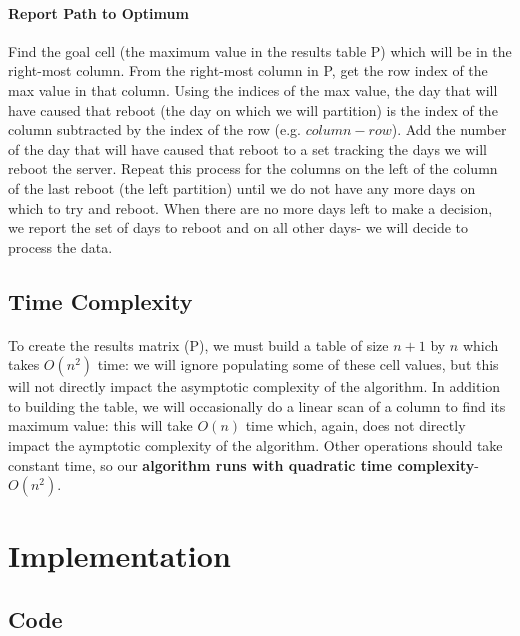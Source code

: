 \documentclass[12pt]{article}
\begin{document}
\paragraph{Report Path to Optimum}
Find the goal cell (the maximum value in the results table P) which will be in the right-most column.
From the right-most column in P, get the row index of the max value in that column.
Using the indices of the max value, the day that will have caused that reboot (the day on which we will partition) is the index of the column subtracted by the index of the row (e.g. $column - row$).
Add the number of the day that will have caused that reboot to a set tracking the days we will reboot the server.
Repeat this process for the columns on the left of the column of the last reboot (the left partition) until we do not have any more days on which to try and reboot.
When there are no more days left to make a decision, we report the set of days to reboot and on all other days- we will decide to process the data.
\subsection{Time Complexity}
\paragraph{}
To create the results matrix (P), we must build a table of size $n + 1$ by $n$ which takes $O(n^2)$ time: we will ignore populating some of these cell values, but this will not directly impact the asymptotic complexity of the algorithm.
In addition to building the table, we will occasionally do a linear scan of a column to find its maximum value: this will take $O(n)$ time which, again, does not directly impact the aymptotic complexity of the algorithm. Other operations should take constant time, so our \textbf{algorithm runs with quadratic time complexity}- $O(n^2)$.
\section{Implementation}
\subsection{Code}
\lstset{tabsize=2,
	numbers=left, numberstyle=\tiny,
	frame=single,
	language=Ruby,
	breaklines=true, breakindent=5pt,
	extendedchars=true
}

\end{document}
